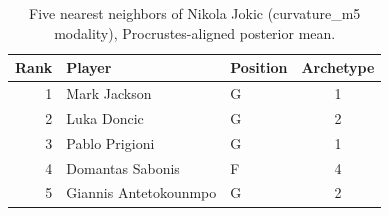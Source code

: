 \begin{table}[htbp]
  \centering\small
  \begin{tabular}{rllc}
    \toprule
    Rank & Player & Position & Archetype \\
    \midrule
    1 & Mark Jackson & G & 1 \\
    2 & Luka Doncic & G & 2 \\
    3 & Pablo Prigioni & G & 1 \\
    4 & Domantas Sabonis & F & 4 \\
    5 & Giannis Antetokounmpo & G & 2 \\
    \bottomrule
  \end{tabular}
  \caption{Five nearest neighbors of Nikola Jokic (curvature_m5 modality), Procrustes-aligned posterior mean.}
  \label{tab:Nikola_Jokic_neighbors_curvature_m5}
\end{table}


